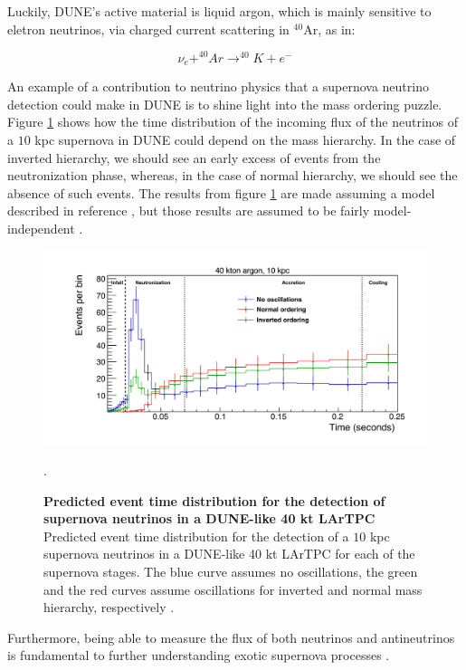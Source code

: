 Luckily, DUNE's active material is liquid argon, which is mainly sensitive to eletron neutrinos, via charged current scattering in $^{40}$Ar, as in:

\begin{equation}
    \nu_e + ^{40}Ar \longrightarrow ^{40}K + e^{-}
    \label{nu_scatter_eq}
\end{equation}
 
An example of a contribution to neutrino physics that a supernova neutrino detection could make in DUNE is to shine light into the mass ordering puzzle. Figure \ref{dune_supernova} shows how the time distribution of the incoming flux of the neutrinos of a $10$ kpc supernova in DUNE could depend on the mass hierarchy. In the case of inverted hierarchy, we should see an early excess of events from the neutronization phase, whereas, in the case of normal hierarchy, we should see the absence of such events. The results from figure \ref{dune_supernova} are made assuming a model described in reference \cite{dune_supernova_model}, but those results are assumed to be fairly model-independent \cite{kate_scholberg}. 

\begin{figure}[h!]
    \centering
    \includegraphics[width=150mm]{Figures/dune_supernova.jpeg}
    \caption[Predicted event time distribution for the detection of supernova neutrinos in a DUNE-like $40$ kt LArTPC]{{\textbf{Predicted event time distribution for the detection of supernova neutrinos in a DUNE-like 40 kt LArTPC}}\\ Predicted event time distribution for the detection of a $10$ kpc supernova neutrinos in a DUNE-like 40 kt LArTPC for each of the supernova stages. The blue curve assumes no oscillations, the green and the red curves assume oscillations for inverted and normal mass hierarchy, respectively \cite{kate_scholberg}.} \cite{Friedland}.
    \label{dune_supernova}
\end{figure}
Furthermore, being able to measure the flux of both neutrinos and antineutrinos is fundamental to further understanding exotic supernova processes \cite{Friedland}. 

